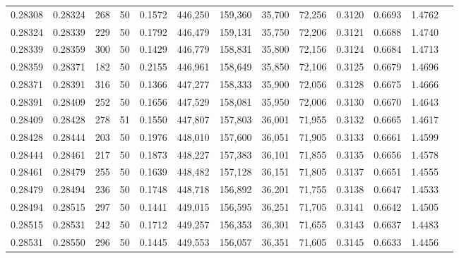 \begin{tabular}{rrrrrrrrrrrrr}
0.28308 & 0.28324 &   268 &  50 &                                     0.1572 & 446,250 & 159,360 &  35,700 &  72,256 & 0.3120 & 0.6693 & 1.4762 \\
0.28324 & 0.28339 &   229 &  50 &                                     0.1792 & 446,479 & 159,131 &  35,750 &  72,206 & 0.3121 & 0.6688 & 1.4740 \\
0.28339 & 0.28359 &   300 &  50 &                                     0.1429 & 446,779 & 158,831 &  35,800 &  72,156 & 0.3124 & 0.6684 & 1.4713 \\
0.28359 & 0.28371 &   182 &  50 &                                     0.2155 & 446,961 & 158,649 &  35,850 &  72,106 & 0.3125 & 0.6679 & 1.4696 \\
0.28371 & 0.28391 &   316 &  50 &                                     0.1366 & 447,277 & 158,333 &  35,900 &  72,056 & 0.3128 & 0.6675 & 1.4666 \\
0.28391 & 0.28409 &   252 &  50 &                                     0.1656 & 447,529 & 158,081 &  35,950 &  72,006 & 0.3130 & 0.6670 & 1.4643 \\
0.28409 & 0.28428 &   278 &  51 &                                     0.1550 & 447,807 & 157,803 &  36,001 &  71,955 & 0.3132 & 0.6665 & 1.4617 \\
0.28428 & 0.28444 &   203 &  50 &                                     0.1976 & 448,010 & 157,600 &  36,051 &  71,905 & 0.3133 & 0.6661 & 1.4599 \\
0.28444 & 0.28461 &   217 &  50 &                                     0.1873 & 448,227 & 157,383 &  36,101 &  71,855 & 0.3135 & 0.6656 & 1.4578 \\
0.28461 & 0.28479 &   255 &  50 &                                     0.1639 & 448,482 & 157,128 &  36,151 &  71,805 & 0.3137 & 0.6651 & 1.4555 \\
0.28479 & 0.28494 &   236 &  50 &                                     0.1748 & 448,718 & 156,892 &  36,201 &  71,755 & 0.3138 & 0.6647 & 1.4533 \\
0.28494 & 0.28515 &   297 &  50 &                                     0.1441 & 449,015 & 156,595 &  36,251 &  71,705 & 0.3141 & 0.6642 & 1.4505 \\
0.28515 & 0.28531 &   242 &  50 &                                     0.1712 & 449,257 & 156,353 &  36,301 &  71,655 & 0.3143 & 0.6637 & 1.4483 \\
0.28531 & 0.28550 &   296 &  50 &                                     0.1445 & 449,553 & 156,057 &  36,351 &  71,605 & 0.3145 & 0.6633 & 1.4456 \\

\end{tabular}
